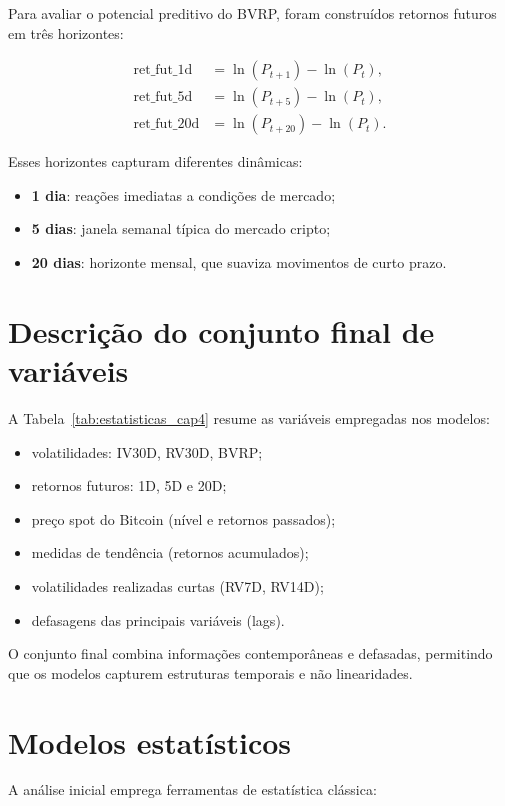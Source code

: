 Para avaliar o potencial preditivo do BVRP, foram construídos retornos futuros
em três horizontes:

\begin{align*}
\text{ret\_fut\_1d} &= \ln(P_{t+1}) - \ln(P_t), \\
\text{ret\_fut\_5d} &= \ln(P_{t+5}) - \ln(P_t), \\
\text{ret\_fut\_20d} &= \ln(P_{t+20}) - \ln(P_t).
\end{align*}

Esses horizontes capturam diferentes dinâmicas:

\begin{itemize}
    \item \textbf{1 dia}: reações imediatas a condições de mercado;
    \item \textbf{5 dias}: janela semanal típica do mercado cripto;
    \item \textbf{20 dias}: horizonte mensal, que suaviza movimentos de curto prazo.
\end{itemize}

\section{Descrição do conjunto final de variáveis}

A Tabela~\ref{tab:estatisticas_cap4} resume as variáveis empregadas nos
modelos:

\begin{itemize}
    \item volatilidades: IV30D, RV30D, BVRP;
    \item retornos futuros: 1D, 5D e 20D;
    \item preço spot do Bitcoin (nível e retornos passados);
    \item medidas de tendência (retornos acumulados);
    \item volatilidades realizadas curtas (RV7D, RV14D);
    \item defasagens das principais variáveis (lags).
\end{itemize}

O conjunto final combina informações contemporâneas e defasadas, permitindo que
os modelos capturem estruturas temporais e não linearidades.

\section{Modelos estatísticos}

A análise inicial emprega ferramentas de estatística clássica:

